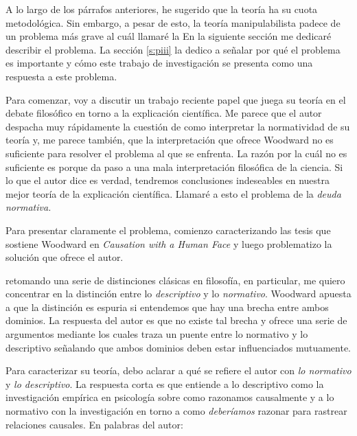 {{A lo largo de los párrafos anteriores, he sugerido que la
teoría ha  su cuota metodológica. Sin embargo, a
pesar de esto, la teoría manipulabilista padece de un
problema más grave al cuál llamaré la 
En la siguiente sección me dedicaré describir el problema.
La sección \ref{s:piii} la dedico a señalar por qué el
problema es importante y cómo este trabajo de investigación
se presenta como una respuesta a este problema.

Para comenzar, voy a discutir un trabajo reciente
papel que juega su teoría en el debate filosófico en torno a
la explicación científica. Me parece que el autor despacha
muy rápidamente la cuestión de como interpretar la
normatividad de su teoría y, me parece también, que la
interpretación que ofrece Woodward no es suficiente para
resolver el problema al que se enfrenta. La razón por la
cuál no es suficiente es porque da paso a una mala
interpretación filosófica de la ciencia. Si lo que el autor
dice es verdad, tendremos conclusiones indeseables en
nuestra mejor teoría de la explicación científica. Llamaré a
esto el problema de la \emph{deuda normativa.}

Para presentar claramente el problema, comienzo
caracterizando las tesis que sostiene Woodward en
\emph{Causation with a Human Face} y luego problematizo la
solución que ofrece el autor.

retomando una serie de distinciones clásicas en filosofía,
en particular, me quiero concentrar en la distinción entre
lo \emph{descriptivo} y lo \emph{normativo}. Woodward
apuesta a que la distinción es espuria si entendemos que hay
una brecha entre ambos dominios. La respuesta del autor es
que no existe tal brecha y ofrece una serie de argumentos
mediante los cuales traza un puente entre lo normativo y lo
descriptivo señalando que ambos dominios deben estar
influenciados mutuamente.

Para caracterizar su teoría, debo aclarar a qué se refiere
el autor con \emph{lo normativo} y \emph{lo descriptivo}. La
respuesta corta es que entiende a lo descriptivo como la
investigación empírica en psicología sobre como razonamos
causalmente y a lo normativo con la investigación en torno a
como \emph{deberíamos} razonar para rastrear relaciones
causales. En palabras del autor:

}}
